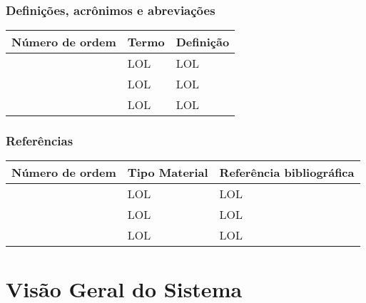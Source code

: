 \documentclass[12pt,a4paper]{article}
\begin{document}
        	
        	\subsubsection{Definições, acrônimos e abreviações}
        	        	\begin{table}[h]
        		        	\noindent\begin{tabular}{|p{}|p{}|p{}|}
        		        		\hline
        		        		\setcounter{Number}{0}
        		        		\textbf{Número de ordem} & \textbf{Termo} & \textbf{Definição} \\
        		        		\hline
        		        		\Item & LOL & LOL \\
        		        		\hline
        		        		\Item & LOL & LOL \\
        		        		\hline
        		        		\Item & LOL & LOL \\
        		        		\hline
        		        	\end{tabular}
        	        	\end{table}
        	        	
        	\subsubsection{Referências}
        	        	\begin{table}[!h]
        		        	\noindent\begin{tabular}{|p{}|p{}|p{}|}
        		        		\hline
        		        		\setcounter{Number}{0}
        		        		\textbf{Número de ordem} & \textbf{Tipo Material} & \textbf{Referência bibliográfica} \\
        		        		\hline
        		        		\Item & LOL & LOL \\
        		        		\hline
        		        		\Item & LOL & LOL \\
        		        		\hline
        		        		\Item & LOL & LOL \\
        		        		\hline
        		        	\end{tabular}
        	        	\end{table}	

        \clearpage
        \section{Visão Geral do Sistema}
        
\end{document}
